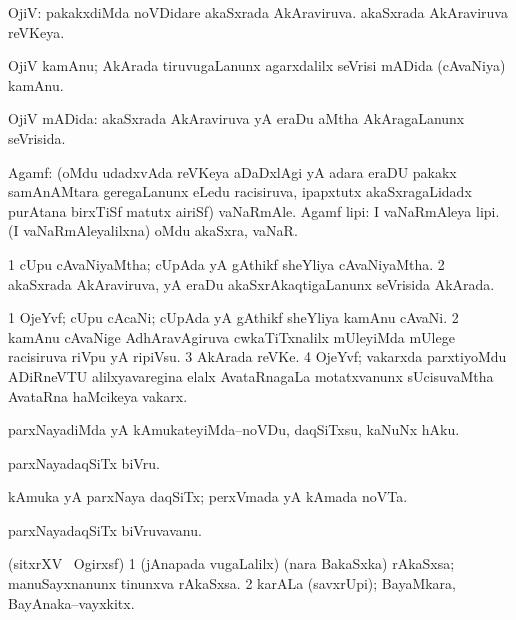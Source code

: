 \bentry
{}
\gl{\gu}
\bmng
OjiV: 
\banum
{} pakakxdiMda noVDidare  akaSxrada AkAraviruva. 
  akaSxrada AkAraviruva reVKeya. 
\eanum
\emng
\eentry

\bentry
{}
\gl{\nA}
\bmng
OjiV kamAnu;  AkArada tiruvugaLanunx agarxdalilx seVrisi mADida (cAvaNiya) kamAnu. 
\emng
\eentry

\bentry
{}
\gl{\gu}
\bmng
OjiV mADida:  akaSxrada AkAraviruva yA eraDu aMtha AkAragaLanunx seVrisida. 
\emng
\eentry

\bentry
{}
\gl{\nA}
\bmng
Agamf: 
\banum
{} (oMdu udadxvAda reVKeya aDaDxlAgi yA adara eraDU pakakx samAnAMtara geregaLanunx eLedu racisiruva, ipapxtutx akaSxragaLidadx purAtana birxTiSf matutx airiSf) vaNaRmAle. 
 Agamf lipi: I vaNaRmAleya lipi. 
 (I vaNaRmAleyalilxna) oMdu akaSxra, vaNaR. 
\eanum
\emng
\eentry

\bentry
{}
\gl{\gu}
\bmng
\bnum
\num{1} cUpu cAvaNiyaMtha; cUpAda yA gAthikf sheYliya cAvaNiyaMtha. 
\num{2}  akaSxrada AkAraviruva, yA eraDu  akaSxrAkaqtigaLanunx seVrisida AkArada. 
\enum
\emng
\eentry

\bentry
{}
\gl{\nA}
\bmng
\bnum
\num{1} OjeYvf; cUpu cAcaNi; cUpAda yA gAthikf sheYliya kamAnu cAvaNi. 
\num{2} kamAnu cAvaNige AdhAravAgiruva cwkaTiTxnalilx mUleyiMda mUlege racisiruva riVpu yA ripiVsu. 
\num{3}  AkArada reVKe. 
\num{4} OjeYvf; vakarxda parxtiyoMdu ADiRneVTU alilxyavaregina elalx AvataRnagaLa motatxvanunx sUcisuvaMtha AvataRna haMcikeya vakarx. 
\enum
\emng
\eentry

\bentry
{}
\gl{\sakirx}
\bmng
parxNayadiMda yA kAmukateyiMda--noVDu, daqSiTxsu, kaNuNx hAku. 
\emng

\noindent
\gl{\akirx}
\bmng
parxNayadaqSiTx biVru. 
\emng
\eentry

\bentry
{}
\gl{\nA}
\bmng
kAmuka yA parxNaya daqSiTx; perxVmada yA kAmada noVTa. 
\emng
\eentry

\bentry
{}
\gl{\nA}
\bmng
parxNayadaqSiTx biVruvavanu. 
\emng
\eentry

\bentry
{}
\gl{\nA}
\bmng
(sitxrXV  \ucAcx\ Ogirxsf) 
\bnum
\num{1} (jAnapada \mo vugaLalilx) (nara BakaSxka) rAkaSxsa; manuSayxnanunx tinunxva rAkaSxsa. 
\num{2} karALa (savxrUpi); BayaMkara, BayAnaka--vayxkitx. 
\enum
\emng
\eentry

